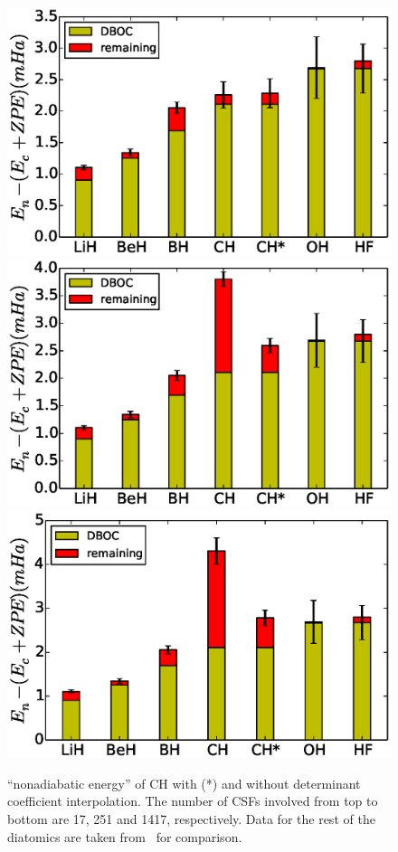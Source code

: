 \documentclass[aip,jcp,numerical,reprint]{revtex4-1}
\begin{document}
\begin{figure}[h]
\includegraphics[scale=0.5]{35}
\includegraphics[scale=0.5]{723}
\includegraphics[scale=0.5]{4738}
\caption{``nonadiabatic energy'' of CH with (*) and without determinant coefficient interpolation. The number of CSFs involved from top to bottom are 17, 251 and 1417, respectively. Data for the rest of the diatomics are taken from~\cite{Yang2015} for comparison.\label{fig:ch-interp} }
\end{figure}
\end{document}
